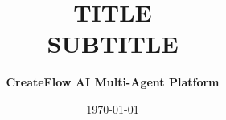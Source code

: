 \documentclass[11pt,a4paper]{report}
\title{
    \vspace{2cm}
    {\Huge \bfseries \color{primary} {{TITLE}}} \\[0.5em]
    {\Large \color{secondary} {{SUBTITLE}}} \\
    \vfill
}
\author{\textbf{CreateFlow AI Multi-Agent Platform}}
\date{\today}
\begin{document}
\maketitle

\begin{abstract}
\end{abstract}

\newpage
\tableofcontents
\newpage
\listoffigures
\listoftables
\newpage






\newpage


\end{document}
